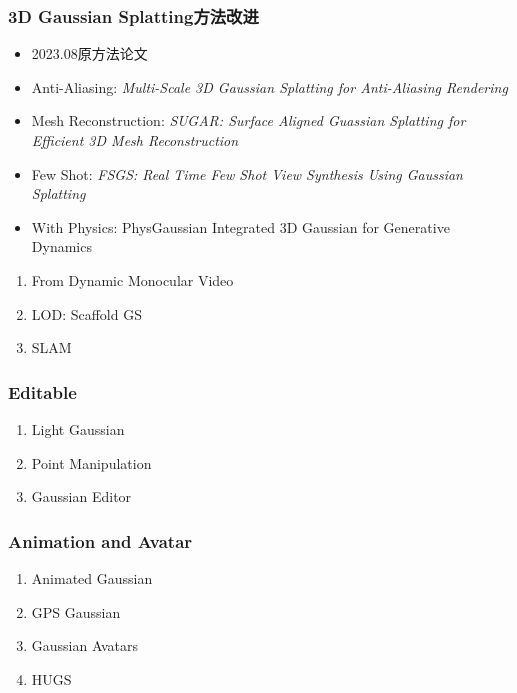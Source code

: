 \begin{frame}
    \frametitle{3D Gaussian Splatting方法改进}
    \begin{itemize}
        \item 2023.08原方法论文 \cite{kerbl3DGaussianSplatting2023}
        \item Anti-Aliasing: \textit{Multi-Scale 3D Gaussian Splatting for Anti-Aliasing Rendering}\cite{yanMultiScale3DGaussian2023}
        \item Mesh Reconstruction: \textit{SUGAR: Surface Aligned Guassian Splatting for Efficient 3D Mesh Reconstruction} \cite{guedonSuGaRSurfaceAlignedGaussian2023}
        \item Few Shot: \textit{FSGS: Real Time Few Shot View Synthesis Using Gaussian Splatting} \cite{zhuFSGSRealTimeFewshot2023}
        \item With Physics: PhysGaussian Integrated 3D Gaussian for Generative Dynamics \cite{xiePhysGaussianPhysicsIntegrated3D2023}
    \end{itemize}   
\end{frame}

\begin{frame}
    \begin{enumerate}
        \item From Dynamic Monocular Video \cite{pokhariyaMANUSMarkerlessHandObject2023}
        \item LOD: Scaffold GS  \cite{luScaffoldGSStructured3D2023}
        \item SLAM \cite{keethaSplaTAMSplatTrack2023}
    \end{enumerate}
\end{frame}


\begin{frame}
    \frametitle{Editable}
    \begin{enumerate}
        \item Light Gaussian \cite{fanLightGaussianUnbounded3D2023}
        \item Point Manipulation \cite{huangPointMoveInteractive2023}
        \item Gaussian Editor \cite{chenGaussianEditorSwiftControllable2023}
    \end{enumerate}
\end{frame}

\begin{frame}
    \frametitle{Animation and Avatar}
    \begin{enumerate}
        \item Animated Gaussian \cite{liuAnimatable3DGaussian2023}
        \item GPS Gaussian \cite{zhengGPSGaussianGeneralizablePixelwise2023}
        \item Gaussian Avatars  \cite{qianGaussianAvatarsPhotorealisticHead2023}
        \item HUGS \cite{kocabasHUGSHumanGaussian2023}
    \end{enumerate}
\end{frame}

